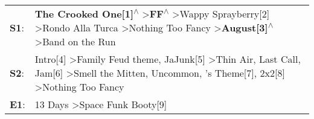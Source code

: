 \begin{supertabular}{p{0.03\textwidth}p{0.92\textwidth}}
 \textbf{S1}:  &                                                                \textbf{The Crooked One[1]\textsuperscript{$\wedge$}} \textgreater \enspace \textbf{FF\textsuperscript{$\wedge$}} \textgreater \enspace Wappy Sprayberry[2]\textsuperscript{} \textgreater \enspace Rondo Alla Turca\textsuperscript{} \textgreater \enspace Nothing Too Fancy\textsuperscript{} \textgreater \enspace \textbf{August[3]\textsuperscript{$\wedge$}} \textgreater \enspace Band on the Run\textsuperscript{}  \enspace  \\
 \textbf{S2}:  &  Intro[4]\textsuperscript{} \textgreater \enspace Family Feud theme\textsuperscript{}, \enspace JaJunk[5]\textsuperscript{} \textgreater \enspace Thin Air\textsuperscript{}, \enspace Last Call\textsuperscript{}, \enspace Jam[6]\textsuperscript{} \textgreater \enspace Smell the Mitten\textsuperscript{}, \enspace Uncommon\textsuperscript{}, 's Theme[7]\textsuperscript{}, \enspace 2x2[8]\textsuperscript{} \textgreater \enspace Nothing Too Fancy\textsuperscript{}  \enspace  \\
 \textbf{E1}:  &                                                                                                                                                                                                                                                                                                                                                                                                      13 Days\textsuperscript{} \textgreater \enspace Space Funk Booty[9]\textsuperscript{}  \enspace  \\
\end{supertabular}
